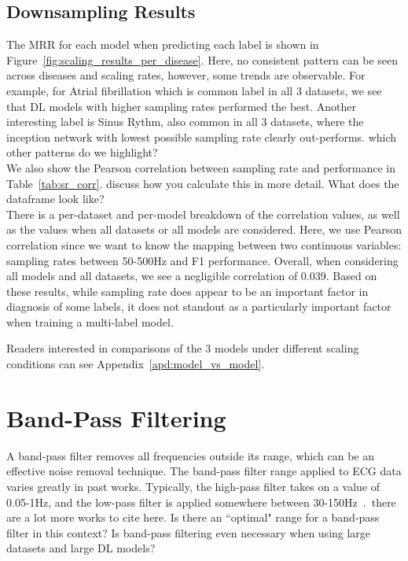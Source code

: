 \documentclass[pmlr,twocolumn]{jmlr}%
\begin{document}
\subsection{Downsampling Results}
The MRR for each model when predicting each label is shown in Figure~\ref{fig:scaling_results_per_disease}. Here, no consistent pattern can be seen across diseases and scaling rates, however, some trends are observable. For example, for Atrial fibrillation which is common label in all 3 datasets, we see that DL models with higher sampling rates performed the best. Another interesting label is Sinus Rythm, also common in all 3 datasets,  where the inception network with lowest possible sampling rate clearly out-performs. {\color{red} which other patterns do we highlight?}\\
We also show the Pearson correlation between sampling rate and performance in Table~\ref{tab:sr_corr}.{\color{red} discuss how you calculate this in more detail. What does the dataframe look like?}\\ There is a per-dataset and per-model breakdown of the correlation values, as well as the values when all datasets or all models are considered. Here, we use Pearson correlation since we want to know the mapping between two continuous variables: sampling rates between 50-500Hz and F1 performance. Overall, when considering all models and all datasets, we see a negligible correlation of 0.039. Based on these results, while sampling rate does appear to be an important factor in diagnosis of some labels, it does not standout as a particularly important factor when training a multi-label model. 

Readers interested in comparisons of the 3 models under different scaling conditions can see Appendix~\ref{apd:model_vs_model}. 

\section{Band-Pass Filtering}
\label{sec:BandPass}
A band-pass filter removes all frequencies outside its range, which can be an effective noise removal technique. The band-pass filter range applied to ECG data varies greatly in past works. Typically, the high-pass filter takes on a value of 0.05-1Hz, and the low-pass filter is applied somewhere between 30-150Hz~\cite{uwaechia2021comprehensive,luo2010review}.~{\color{red}there are a lot more works to cite here}. Is there an ``optimal" range for a band-pass filter in this context? Is band-pass filtering even necessary when using large datasets and large DL models?
\end{document}
